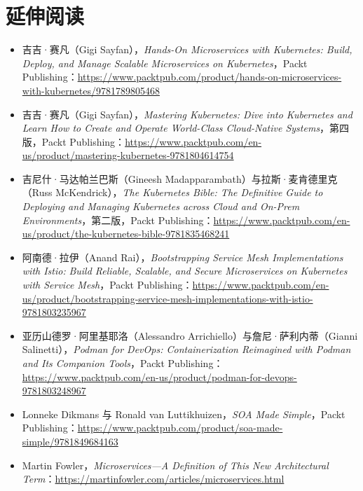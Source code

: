 \section{延伸阅读}

\begin{itemize}
\item 吉吉·赛凡（Gigi Sayfan），\emph{Hands-On Microservices with Kubernetes: Build, Deploy, and Manage Scalable Microservices on Kubernetes}，Packt Publishing：\href{https://www.packtpub.com/product/hands-on-microservices-with-kubernetes/9781789805468}{https://www.packtpub.com/product/hands-on-microservices-with-kubernetes/9781789805468}
\item 吉吉·赛凡（Gigi Sayfan），\emph{Mastering Kubernetes: Dive into Kubernetes and Learn How to Create and Operate World-Class Cloud-Native Systems}，第四版，Packt Publishing：\href{https://www.packtpub.com/en-us/product/mastering-kubernetes-9781804614754}{https://www.packtpub.com/en-us/product/mastering-kubernetes-9781804614754}
\item 吉尼什·马达帕兰巴斯（Gineesh Madapparambath）与拉斯·麦肯德里克（Russ McKendrick），\emph{The Kubernetes Bible: The Definitive Guide to Deploying and Managing Kubernetes across Cloud and On-Prem Environments}，第二版，Packt Publishing：\href{https://www.packtpub.com/en-us/product/the-kubernetes-bible-9781835468241}{https://www.packtpub.com/en-us/product/the-kubernetes-bible-9781835468241}
\item 阿南德·拉伊（Anand Rai），\emph{Bootstrapping Service Mesh Implementations with Istio:} \emph{Build Reliable, Scalable, and Secure Microservices on Kubernetes with Service Mesh}，Packt Publishing：\href{https://www.packtpub.com/en-us/product/bootstrapping-service-mesh-implementations-with-istio-9781803235967}{https://www.packtpub.com/en-us/product/bootstrapping-service-mesh-implementations-with-istio-9781803235967}
\item 亚历山德罗·阿里基耶洛（Alessandro Arrichiello）与詹尼·萨利内蒂（Gianni Salinetti），\emph{Podman for DevOps: Containerization Reimagined with Podman and Its Companion Tools}，Packt Publishing：\href{https://www.packtpub.com/en-us/product/podman-for-devops-9781803248967}{https://www.packtpub.com/en-us/product/podman-for-devops-9781803248967}
\item Lonneke Dikmans 与 Ronald van Luttikhuizen，\emph{SOA Made Simple}，Packt Publishing：\href{https://www.packtpub.com/product/soa-made-simple/9781849684163}{https://www.packtpub.com/product/soa-made-simple/9781849684163}
\item Martin Fowler，\emph{Microservices—A Definition of This New Architectural Term}：\href{https://martinfowler.com/articles/microservices.html}{https://martinfowler.com/articles/microservices.html}

\end{itemize}
